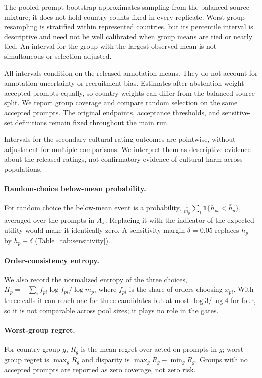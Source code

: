 \documentclass[letterpaper]{article}
\begin{document}
The pooled prompt bootstrap approximates sampling from the balanced source mixture; it does not hold country counts fixed in every replicate. Worst-group resampling is stratified within represented countries, but its percentile interval is descriptive and need not be well calibrated when group means are tied or nearly tied. An interval for the group with the largest observed mean is not simultaneous or selection-adjusted.

All intervals condition on the released annotation means. They do not account for annotation uncertainty or recruitment bias. Estimates after abstention weight accepted prompts equally, so country weights can differ from the balanced source split. We report group coverage and compare random selection on the same accepted prompts. The original endpoints, acceptance thresholds, and sensitive-set definitions remain fixed throughout the main run.

Intervals for the secondary cultural-rating outcomes are pointwise, without adjustment for multiple comparisons. We interpret them as descriptive evidence about the released ratings, not confirmatory evidence of cultural harm across populations.

\paragraph{Random-choice below-mean probability.} For random choice the below-mean event is a probability, $\frac{1}{m_p}\sum_i \mathbf{1}\{h_{pi}<\bar h_p\}$, averaged over the prompts in $A_\pi$. Replacing it with the indicator of the expected utility would make it identically zero. A sensitivity margin $\delta=0.05$ replaces $\bar h_p$ by $\bar h_p-\delta$ (Table~\ref{tab:sensitivity}).
\paragraph{Order-consistency entropy.} We also record the normalized entropy of the three choices, $H_p=-\sum_i f_{pi}\log f_{pi}/\log m_p$, where $f_{pi}$ is the share of orders choosing $x_{pi}$. With three calls it can reach one for three candidates but at most $\log 3/\log 4$ for four, so it is not comparable across pool sizes; it plays no role in the gates.
\paragraph{Worst-group regret.} For country group $g$, $R_g$ is the mean regret over acted-on prompts in $g$; worst-group regret is $\max_g R_g$ and disparity is $\max_g R_g-\min_g R_g$. Groups with no accepted prompts are reported as zero coverage, not zero risk.
\end{document}
